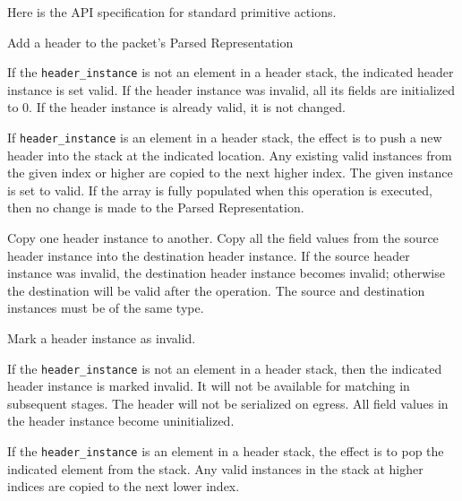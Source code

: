 \documentclass[12pt]{article}
\begin{document}
Here is the API specification for standard primitive actions.


{ %
Add a header to the packet's Parsed Representation
}
{ %
}
{ %
If the \texttt{header_instance} is not an element in a header stack, the indicated 
header instance is set valid. If the header instance was invalid, all its 
fields are initialized to 0. If the header instance is already valid, it is 
not changed.

If \texttt{header_instance} is an element in a header stack, the effect is to push 
a new header into the stack at the indicated location. Any existing valid 
instances from the given index or higher are copied to the next higher index. 
The given instance is set to valid. If the array is fully populated when this 
operation is executed, then no change is made to the Parsed Representation.
}


{ %
Copy one header instance to another.
}
{ %
}
{ %
Copy all the field values from the source header instance into the destination 
header instance. If the source header instance was invalid, the destination 
header instance becomes invalid; otherwise the destination will be valid 
after the operation. The source and destination instances must be of the 
same type.
}


{ %
Mark a header instance as invalid.
}
{ %
}
{ %
If the \texttt{header_instance} is not an element in a header stack, then the indicated 
header instance is marked invalid. It will not be available for matching in 
subsequent \matchaction stages. The header will not be serialized on egress. 
All field values in the header instance become uninitialized.

If the \texttt{header_instance} is an element in a header stack, the effect is to 
pop the indicated element from the stack. Any valid instances in the stack 
at higher indices are copied to the next lower index.
}
\end{document}
